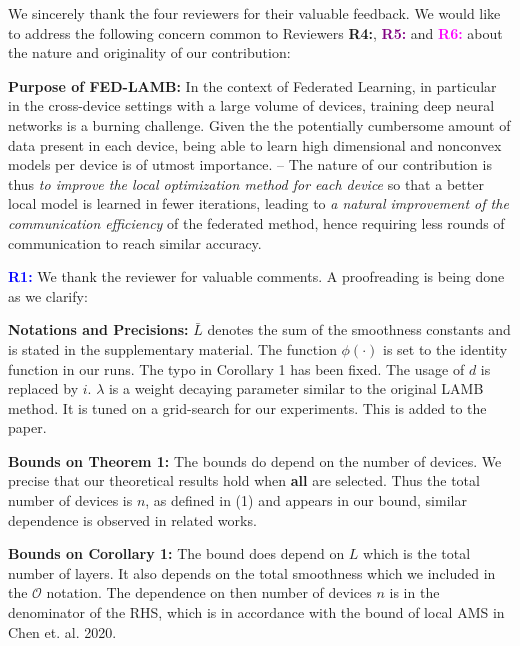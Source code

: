 \documentclass{article}
\begin{document}
We sincerely thank the four reviewers for their valuable feedback. We would like to address the following concern common to Reviewers \textbf{\textcolor{green!50!black}{R4:}}, \textbf{\textcolor{purple}{R5:}} and \textbf{\textcolor{magenta}{R6:}} about the nature and originality of our contribution:\vspace{-5pt}

\textbf{Purpose of FED-LAMB:} 
In the context of Federated Learning, in particular in the cross-device settings with a large volume of devices, training deep neural networks is a burning challenge.
Given the the potentially cumbersome amount of data present in each device, being able to learn high dimensional and nonconvex models per device is of utmost importance.
-- The nature of our contribution is thus \emph{to improve the local optimization method for each device} so that a better local model is learned in fewer iterations, leading to \emph{a natural improvement of the communication efficiency} of the federated method, hence requiring less rounds of communication to reach similar accuracy.
\vspace{-2pt}

\textbf{\textcolor{blue}{R1:}} We thank the reviewer for valuable comments. A proofreading is being done as we clarify:\vspace{-5pt}


\textbf{Notations and Precisions:} 
$\bar{L}$ denotes the sum of the smoothness constants and is stated in the supplementary material. The function $\phi(\cdot)$ is set to the identity function in our runs. The typo in Corollary 1 has been fixed.
The usage of $d$ is replaced by $i$.
$\lambda$ is a weight decaying parameter similar to the original LAMB method. It is tuned on a grid-search for our experiments. This is added to the paper.

\vspace{-2pt}
\textbf{Bounds on Theorem 1:} The bounds do depend on the number of devices.
We precise that our theoretical results hold when \textbf{all} are selected. Thus the total number of devices is $n$, as defined in (1) and appears in our bound, similar dependence is observed in related works.
 
 \vspace{-2pt}
\textbf{Bounds on Corollary 1:} The bound does depend on $L$ which is the total number of layers. It also depends on the total smoothness which we included in the $\mathcal{O}$ notation.
The dependence on then number of devices $n$ is in the denominator of the RHS, which is in accordance with the bound of local AMS in Chen et. al. 2020.
\end{document}
